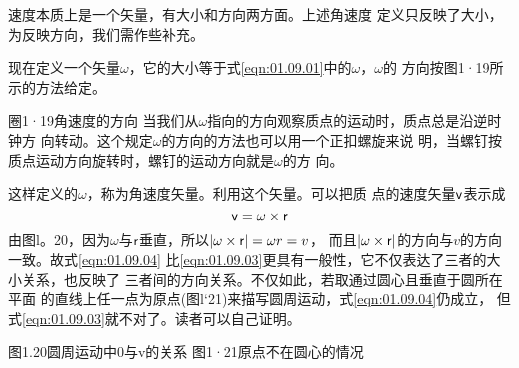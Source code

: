 速度本质上是一个矢量，有大小和方向两方面。上述角速度
定义只反映了大小，为反映方向，我们需作些补充。

现在定义一个矢量$\omega$，它的大小等于式\eqref{eqn:01.09.01}中的$\omega$，$\omega$的
方向按图1·19所示的方法给定。

圈1·19角速度的方向
当我们从$\omega$指向的方向观察质点的运动时，质点总是沿逆时钟方
向转动。这个规定$\omega$的方向的方法也可以用一个正扣螺旋来说
明，当螺钉按质点运动方向旋转时，螺钉的运动方向就是$\omega$的方
向。

这样定义的$\omega$，称为角速度矢量。利用这个矢量。可以把质
点的速度矢量${\sf v}$表示成
\begin{equation}\label{eqn:01.09.04}
    {\sf v}=\omega\times {\sf r}
\end{equation}
由图l。20，因为$\omega$与${\sf r}$垂直，所以$|\omega\times{\sf r}|=\omega r=v$，
而且$|\omega\times{\sf r}|$的方向与$v$的方向一致。故式\eqref{eqn:01.09.04}
比\eqref{eqn:01.09.03}更具有一般性，它不仅表达了三者的大小关系，也反映了
三者间的方向关系。不仅如此，若取通过圆心且垂直于圆所在平面
的直线上任一点为原点(图l‘21)来描写圆周运动，式\eqref{eqn:01.09.04}仍成立，
但式\eqref{eqn:01.09.03}就不对了。读者可以自己证明。

图1.20圆周运动中0与v的关系  图1·21原点不在圆心的情况